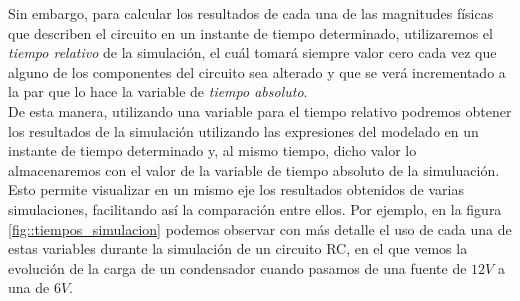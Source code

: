 \documentclass[../main.tex]{subfiles}
\begin{document}
Sin embargo, para calcular los resultados de cada una de las magnitudes físicas que describen el circuito en un instante de tiempo determinado, utilizaremos el \textit{tiempo relativo} de la simulación, el cuál tomará siempre valor cero cada vez que alguno de los componentes del circuito sea alterado y que se verá incrementado a la par que lo hace la variable de \textit{tiempo absoluto}.\\

De esta manera, utilizando una variable para el tiempo relativo podremos obtener los resultados de la simulación utilizando las expresiones del modelado en un instante de tiempo determinado y, al mismo tiempo, dicho valor lo almacenaremos con el valor de la variable de tiempo absoluto de la simuluación. Esto permite visualizar en un mismo eje los resultados obtenidos de varias simulaciones, facilitando así la comparación entre ellos. Por ejemplo, en la figura \ref{fig::tiempos_simulacion} podemos observar con más detalle el uso de cada una de estas variables durante la simulación de un circuito RC, en el que vemos la evolución de la carga de un condensador cuando pasamos de una fuente de $12V$ a una de $6V$.\\
\end{document}
